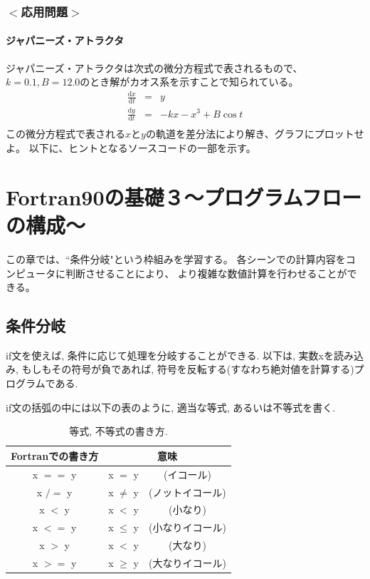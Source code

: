\documentclass[a4j]{jsbook}
\begin{document}
\subsection*{$<$応用問題$>$}
\subsubsection{ジャパニーズ・アトラクタ}
ジャパニーズ・アトラクタは次式の微分方程式で表されるもので、
$k=0.1, B=12.0$のとき解がカオス系を示すことで知られている。
\begin{eqnarray}
  \frac{\mathrm{d}x}{\mathrm{d}t} &=& y\\
  \frac{\mathrm{d}y}{\mathrm{d}t} &=& -kx - x^3 + B \cos t\\
\end{eqnarray}
この微分方程式で表される$x$と$y$の軌道を差分法により解き、グラフにプロットせよ。
以下に、ヒントとなるソースコードの一部を示す。



\chapter{Fortran90の基礎３〜プログラムフローの構成〜}
この章では、``条件分岐"という枠組みを学習する。
各シーンでの計算内容をコンピュータに判断させることにより、
より複雑な数値計算を行わせることができる。

\section{条件分岐}
{\ttfamily if}文を使えば, 条件に応じて処理を分岐することができる.
以下は, 実数xを読み込み, もしもその符号が負であれば,
符号を反転する(すなわち絶対値を計算する)プログラムである.

{\ttfamily if}文の括弧の中には以下の表のように, 適当な等式, あるいは不等式を書く.

\begin{table}[h]
  \caption{等式, 不等式の書き方. }
  \begin{center}
    \begin{tabular}{ccc}
      \hline
      Fortranでの書き方   & \multicolumn{2}{c}{意味} \\ \hline
      x $==$ y   & x $=$ y &(イコール)\\
      x $/=$ y   & x $\ne$ y &(ノットイコール)\\
      x $<$ y   & x $<$ y &(小なり)\\
      x $<=$ y  & x $\le$ y &(小なりイコール)\\
      x $>$ y  & x $<$ y &(大なり)\\
      x $>=$ y   & x $\ge$ y &(大なりイコール)\\ \hline
    \end{tabular}
  \end{center}
\end{table}
\end{document}
